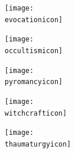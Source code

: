 \begin{titlepage}
\begin{center}
\begin{minipage}[c]{8cm}
{\fontsize{12}{14.4}\selectfont

\begin{center}
\hypertarget{tableofcontents}{\noindent\hyperlink{howtousethisdoc}{\howtousethisdoc}}

\vspace*{20pt}











\vspace*{20pt}

\noindent\hyperlink{magicphasesummary}{\magicphasesummary}
\end{center}
}

\end{minipage}\hfill
\begin{minipage}[c]{\minipagewidth}
\begin{center}

\texttt{[image: \\evocationicon]}

\vspace*{\spacebetweeniconrows}

\texttt{[image: \\occultismicon]}

\vspace*{\spacebetweeniconrows}

\texttt{[image: \\pyromancyicon]}

\vspace*{\spacebetweeniconrows}

\texttt{[image: \\witchcrafticon]}

\vspace*{\spacebetweeniconrows}

\texttt{[image: \\thaumaturgyicon]}
\end{center}
\end{minipage}\hspace*{0.5cm}


\end{center}
\end{titlepage}
